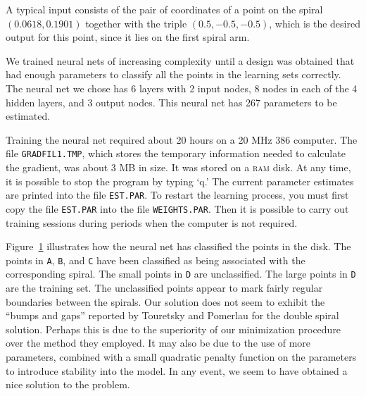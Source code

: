 \documentclass{admbmanual}
\begin{document}
A typical input consists of the pair of coordinates of a point on the spiral
$(0.0618,0.1901)$ together with the triple $(0.5,-0.5,-0.5)$, which is the
desired output for this point, since it lies on the first spiral arm.

We trained neural nets of increasing complexity until a design was obtained that
had enough parameters to classify all the points in the learning sets correctly.
The neural net we chose has 6 layers with 2 input nodes, 8 nodes in each of the
4 hidden layers, and 3 output nodes. This neural net has 267 parameters to be
estimated.

Training the neural net required about 20 hours on a 20 MHz 386 computer. The
file \texttt{GRADFIL1.TMP}, which stores the temporary information needed to
calculate the gradient, was about 3 MB in size. It was stored on a \textsc{ram}
disk. At any time, it is possible to stop the program by typing `q.' The current
parameter estimates are printed into the file \texttt{EST.PAR}. To restart the
learning process, you must first copy the file \texttt{EST.PAR} into the file
\texttt{WEIGHTS.PAR}. Then it is possible to carry out training sessions during
periods when the computer is not required.
\begin{figure}[h]
  \centering\hskip1pt
   
   \emptycaption{}
   \label{fig:description-nn-02} %
\end{figure}
Figure~\ref{fig:description-nn-02} %
illustrates how the neural net has classified the points in the disk. The points
in \texttt{A}, \texttt{B}, and \texttt{C} have been classified as being
associated with the corresponding spiral. The small points in \texttt{D} are
unclassified. The large points in \texttt{D} are the training set. The
unclassified points appear to mark fairly regular boundaries between the
spirals. Our solution does not seem to exhibit the ``bumps and gaps'' reported
by Touretsky and Pomerlau for the double spiral solution. Perhaps this is due to
the superiority of our minimization procedure over the method they employed. It
may also be due to the use of more parameters, combined with a small quadratic
penalty function on the parameters to introduce stability into the model. In any
event, we seem to have obtained a nice solution to the problem.




\printindex  %
\end{document}
